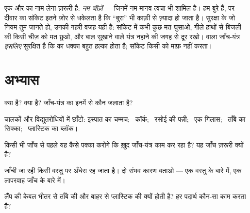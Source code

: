 \begin{remark}[पानी, लोग, और नियम क्यों हैं]\label{rem:g4:conductors-insulators:safety}
एक और  का नाम लेना ज़रूरी है: \emph{नम चीज़ें} --- जिनमें नम
मानव त्वचा भी शामिल है। हम बुरे  हैं, पर दीवार का सॉकेट इतने
ज़ोर से धकेलता है कि ``बुरा'' भी काफ़ी से ज़्यादा हो जाता है।
सुरक्षा के जो नियम तुम जानते हो, उनकी गहरी वजह यही है: सॉकेट में कभी
कुछ मत घुसाओ, गीले हाथों से बिजली की किसी चीज़ को मत छुओ, और बाल
सुखाने वाले यंत्र नहाने की जगह से दूर रखो।  वाला जाँच-यंत्र
\emph{इसलिए} सुरक्षित है कि  का धक्का बहुत हल्का होता है; सॉकेट
किसी को माफ़ नहीं करता।
\end{remark}

\section{अभ्यास}

\begin{exercise}[$\star$]\label{exo:g4:conductors-insulators:1}
 क्या है?  क्या है? जाँच-यंत्र का  इनमें से कौन
जलाता है?
\end{exercise}

\begin{exercise}[$\star$]\label{exo:g4:conductors-insulators:2}
चालकों और विद्युतरोधियों में छाँटो: इस्पात का चम्मच; \ कॉर्क; \
रसोई की पन्नी; \ एक गिलास; \ ताँबे का सिक्का; \ प्लास्टिक का ब्लॉक।
\end{exercise}

\begin{exercise}[$\star$]\label{exo:g4:conductors-insulators:3}
किसी भी जाँच से पहले यह कैसे पक्का करोगे कि ख़ुद जाँच-यंत्र काम कर
रहा है? यह जाँच ज़रूरी क्यों है?
\end{exercise}

\begin{exercise}[$\star$]\label{exo:g4:conductors-insulators:4}
जाँची जा रही किसी वस्तु पर  अँधेरा रह जाता है। दो संभव कारण बताओ
--- एक वस्तु के बारे में, एक लापरवाह जाँच के बारे में।
\end{exercise}

\begin{exercise}[$\star$]\label{exo:g4:conductors-insulators:5}
लैंप की केबल भीतर से ताँबे की और बाहर से प्लास्टिक की क्यों होती है?
हर पदार्थ कौन-सा काम करता है?
\end{exercise}

